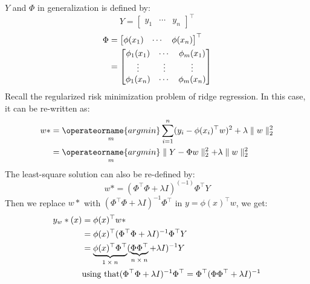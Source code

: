 $Y$ and $\Phi$ in generalization is defined by:
\begin{equation}
    Y=\begin{bmatrix}
         y_1&\cdots&y_n
      \end{bmatrix}^\top 
\end{equation}
\begin{align}
    \Phi&=\begin{bmatrix}
           \phi(x_1)&\cdots&\phi(x_n) 
          \end{bmatrix}^\top \notag\\
        &=\begin{bmatrix}
           \phi_1(x_1)&\cdots&\phi_m(x_1)\\
           \vdots&\vdots&\vdots \\
           \phi_1(x_n)&\cdots&\phi_m(x_n)
          \end{bmatrix}
\end{align}
Recall the regularized risk minimization problem of ridge regression. In this case, it can be re-written as:
\begin{align*}
    w*&=\underset{m}{\operateorname{argmin}}\sum_{i=1}^n(y_i-\phi(x_i)^\top w)^2+\lambda\parallel w \parallel_2^2\\
      &=\underset{m}{\operateorname{argmin}}\parallel Y-\Phi w\parallel_2^2+\lambda\parallel w\parallel_2^2
\end{align*}
The least-square solution can also be re-defined by:
\begin{equation}
    w*=(\Phi^\top\Phi+\lambda I)^(-1)\Phi^\top Y
\end{equation}
Then we replace $w*$ with $(\Phi^\top \Phi+\lambda I)^{-1}\Phi^\top$ in $y=\phi(x)^\top w$, we get:
\begin{align}
    y_w* (x)&=\phi(x)^\top w*\notag\\
            &=\phi(x)^\top(\Phi^\top \Phi+\lambda I)^{-1}\Phi^\top Y\notag\\
            &=\underbrace{\phi(x)^\top \Phi^\top}_\text{$1\times n$}(\underbrace{\Phi\Phi^\top}_\text{$n\times n$}+\lambda I)^{-1}Y\\
            &\text{using that} (\Phi^\top \Phi+\lambda I)^{-1}\Phi^\top=\Phi^\top(\Phi\Phi^\top+\lambda I)^{-1}\notag
\end{align}


